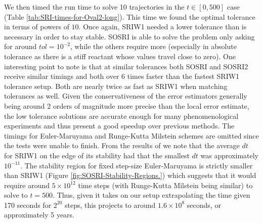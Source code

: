 \documentclass{article}
\begin{document}
We then timed the run time to solve 10 trajectories in the $t\in\left[0,500\right]$
case (Table \ref{tab:SRI-times-for-Oval2-long}). This time we found
the optimal tolerance in terms of powers of $10$. Once again, SRIW1
needed a lower tolerance than is necessary in order to stay stable.
SOSRI is able to solve the problem only asking for around $tol=10^{-2}$,
while the others require more (especially in absolute tolerance as
there is a stiff reactant whose values travel close to zero). One
interesting point to note is that at similar tolerances both SOSRI
and SOSRI2 receive similar timings and both over 6 times faster than
the fastest SRIW1 tolerance setup. Both are nearly twice as fast as
SRIW1 when matching tolerances as well. Given the conservativeness
of the error estimators generally being around 2 orders of magnitude
more precise than the local error estimate, the low tolerance solutions
are accurate enough for many phenomenological experiments and thus
present a good speedup over previous methods. The timings for Euler-Maruyama
and Runge-Kutta Milstein schemes are omitted since the tests were
unable to finish. From the results of \cite{RN3787} we note that
the average $dt$ for SRIW1 on the edge of its stability had that
the smallest $dt$ was approximately $10^{-11}$. The stability region
for fixed step-size Euler-Maruyama is strictly smaller than SRIW1
(Figure \ref{fig:SOSRI-Stability-Regions.}) which suggests that it
would require around $5\times10^{12}$ time steps (with Runge-Kutta
Milstein being similar) to solve to $t=500$. Thus, given it takes
on our setup extrapolating the time given 170 seconds for $2^{20}$
steps, this projects to around $1.6\times10^{8}$ seconds, or approximately
5 years.
\end{document}

